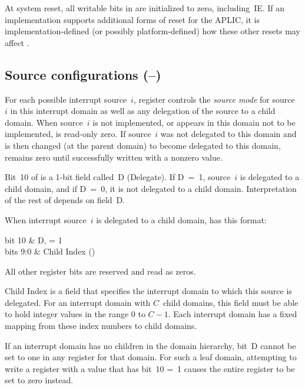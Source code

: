 At system reset, all writable bits in  are initialized to
zero, including~IE.
If an implementation supports additional forms of reset for the APLIC,
it is implementation-defined (or possibly platform-defined) how these
other resets may affect .

\subsection{%
Source configurations
 (--)%
}
\label{sec:AdvPLIC-reg-sourcecfg}

For each possible interrupt source~$i$, register 
controls the \emph{source mode} for source~$i$ in this interrupt domain
as well as any delegation of the source to a child domain.
When source~$i$ is not implemented, or appears in this domain not to be
implemented,  is read-only zero.
If source~$i$ was not delegated to this domain and is then
changed (at the parent domain) to become delegated to this domain,
 remains zero until successfully written with a
nonzero value.

Bit~10 of  is a \mbox{1-bit} field called~D
(Delegate).
If D~=~1, source~$i$ is delegated to a child domain, and if D~=~0, it
is not delegated to a child domain.
Interpretation of the rest of  depends on field~D.

When interrupt source~$i$ is delegated to a child domain,
 has this format:\nopagebreak
\begin{displayLinesTable}[l@{\qquad}l]
bit 10   & D, = 1 \\
bits 9:0 & Child Index (\WLRL) \\
\end{displayLinesTable}
All other register bits are reserved and read as zeros.

Child Index is a {\WLRL} field that specifies the interrupt domain to
which this source is delegated.
For an interrupt domain with $C$~child domains, this field must be able
to hold integer values in the range 0 to ${C-\mbox{1}}$.
Each interrupt domain has a fixed mapping from these index numbers to
child domains.

If an interrupt domain has no children in the domain hierarchy, bit~D
cannot be set to one in any  register for that domain.
For such a leaf domain, attempting to write a  register
with a value that has bit~10 =~1 causes the entire register to be set
to zero instead.

